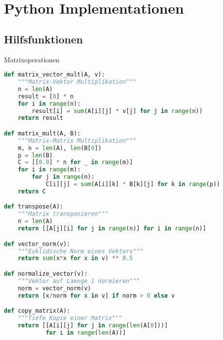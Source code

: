\section{Python Implementationen}

\subsection{Hilfsfunktionen}

\begin{examplecode}{Matrixoperationen}
\begin{lstlisting}[language=Python, style=basesmol]
def matrix_vector_mult(A, v):
    """Matrix-Vektor Multiplikation"""
    n = len(A)
    result = [0] * n
    for i in range(n):
        result[i] = sum(A[i][j] * v[j] for j in range(n))
    return result

def matrix_mult(A, B):
    """Matrix-Matrix Multiplikation"""
    m, n = len(A), len(B[0])
    p = len(B)
    C = [[0.0] * n for _ in range(m)]
    for i in range(m):
        for j in range(n):
            C[i][j] = sum(A[i][k] * B[k][j] for k in range(p))
    return C

def transpose(A):
    """Matrix transponieren"""
    n = len(A)
    return [[A[j][i] for j in range(n)] for i in range(n)]

def vector_norm(v):
    """Euklidische Norm eines Vektors"""
    return sum(x*x for x in v) ** 0.5

def normalize_vector(v):
    """Vektor auf Laenge 1 normieren"""
    norm = vector_norm(v)
    return [x/norm for x in v] if norm > 0 else v

def copy_matrix(A):
    """Tiefe Kopie einer Matrix"""
    return [[A[i][j] for j in range(len(A[0]))] 
            for i in range(len(A))]
\end{lstlisting}
\end{examplecode}

